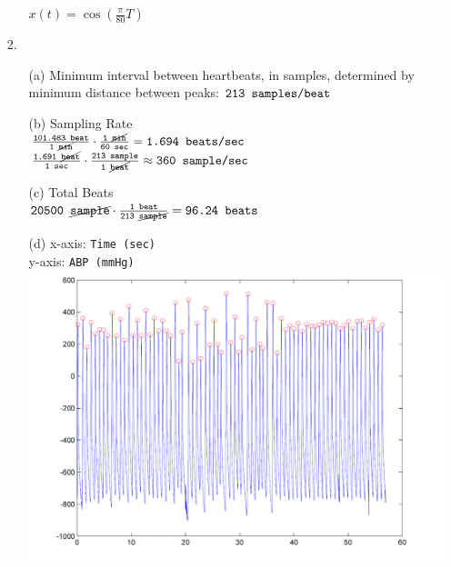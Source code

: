 \documentclass{article}
\begin{document}
\begin{enumerate}
\begin{enumerate}
		        $x(t) = \cos{\left( \frac{\pi}{80} T \right)}$
	\end{enumerate}

\newpage

\item[2.]
	\begin{enumerate}
	\item[(a)] 
		        Minimum interval between heartbeats, in samples, determined by minimum distance between peaks: $\texttt{213 \text{samples/beat}}$
\bigskip
	\item[(b)] 
		        Sampling Rate\\
		        \newline
		        $\frac{\texttt{101.483 \text{beat}}}{\texttt{1 \cancel{\text{min}}}} \cdot  \frac{\texttt{1 \cancel{\text{min}}}}{\texttt{60 \text{sec}}} = \texttt{1.694 \text{beats/sec}}$\\
		        \newline
		        $\frac{\texttt{1.691 \cancel{\text{beat}}}}{\texttt{1 \text{sec}}} \cdot  \frac{\texttt{213 \text{sample}}}{\texttt{1 \cancel{\text{beat}}}} \approx \texttt{360 \text{sample/sec}}$
\bigskip
	\item[(c)] 
		        Total Beats\\
		        \newline
		        $\texttt{20500 \cancel{\text{sample}}} \cdot  \frac{\texttt{1 {\text{beat}}}}{\texttt{213 \cancel{\text{sample}}}} = \texttt{96.24 \text{beats}}$
\bigskip
	\item[(d)] 
		        x-axis: \texttt{Time (sec)}\\
		        y-axis: \texttt{ABP (mmHg)}\\
		        \includegraphics[width=\linewidth]{2dpeaks} 
	\end{enumerate}


\end{enumerate}
\end{document}

